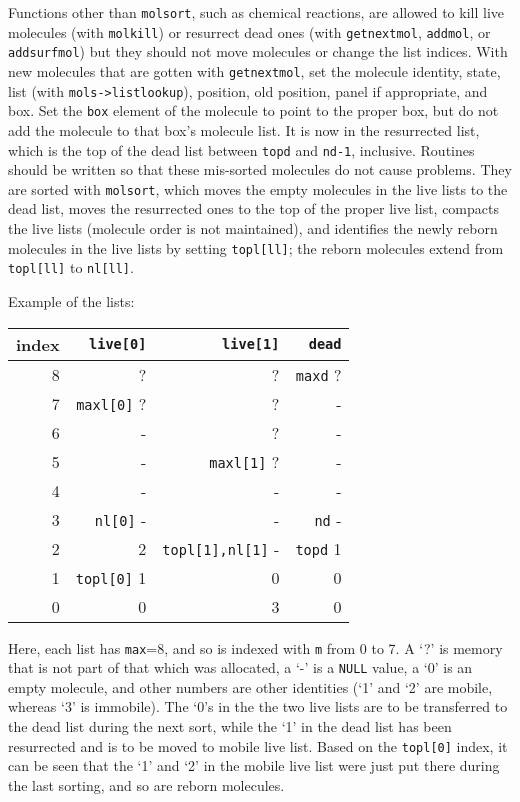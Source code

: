 \documentclass {book}
\begin{document}
Functions other than \texttt{molsort}, such as chemical reactions, are allowed to kill live molecules (with \texttt{molkill}) or resurrect dead ones (with \texttt{getnextmol}, \texttt{addmol}, or \texttt{addsurfmol}) but they should not move molecules or change the list indices.  With new molecules that are gotten with \texttt{getnextmol}, set the molecule identity, state, list (with \texttt{mols->listlookup}), position, old position, panel if appropriate, and box.  Set the \texttt{box} element of the molecule to point to the proper box, but do not add the molecule to that box's molecule list.  It is now in the resurrected list, which is the top of the dead list between \texttt{topd} and \texttt{nd-1}, inclusive.  Routines should be written so that these mis-sorted molecules do not cause problems.  They are sorted with \texttt{molsort}, which moves the empty molecules in the live lists to the dead list, moves the resurrected ones to the top of the proper live list, compacts the live lists (molecule order is not maintained), and identifies the newly reborn molecules in the live lists by setting \texttt{topl[ll]}; the reborn molecules extend from \texttt{topl[ll]} to \texttt{nl[ll]}.

Example of the lists:

\begin{longtable}[c]{rrrr}
index & \texttt{live[0]} & \texttt{live[1]} & \texttt{dead}\\
\hline
8 & ? & ? & \texttt{maxd} ?\\
7 & \texttt{maxl[0]} ? & ? & -\\
6 & - & ? & -\\
5 & - & \texttt{maxl[1]} ? & -\\
4 & - & - & -\\
3 & \texttt{nl[0]} - & - & \texttt{nd} -\\
2 & 2 & \texttt{topl[1],nl[1]} - & \texttt{topd} 1\\
1 & \texttt{topl[0]} 1 & 0 & 0\\
0 & 0 & 3 & 0\\
 \end{longtable}

Here, each list has \texttt{max}=8, and so is indexed with \texttt{m} from 0 to 7.  A `?' is memory that is not part of that which was allocated, a `-' is a \texttt{NULL} value, a `0' is an empty molecule, and other numbers are other identities (`1' and `2' are mobile, whereas `3' is immobile).  The `0's in the the two live lists are to be transferred to the dead list during the next sort, while the `1' in the dead list has been resurrected and is to be moved to mobile live list.  Based on the \texttt{topl[0]} index, it can be seen that the `1' and `2' in the mobile live list were just put there during the last sorting, and so are reborn molecules.
\end{document}
